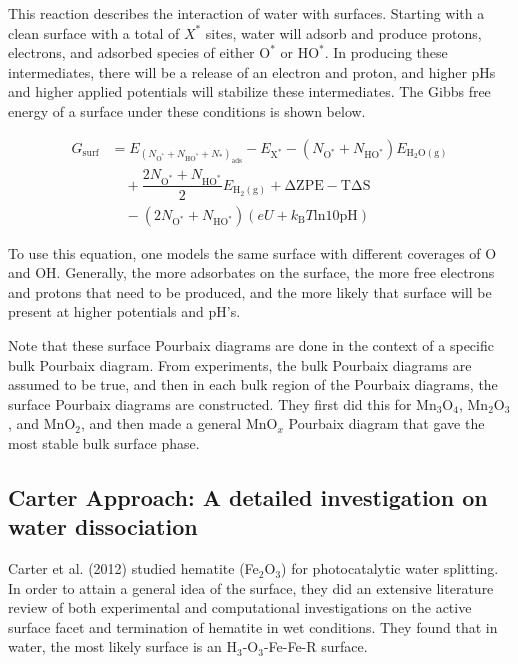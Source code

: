 \documentclass[11pt]{article}
\begin{document}
   This reaction describes the interaction of water with
   surfaces. Starting with a clean surface with a total of $X^\ast$
   sites, water will adsorb and produce protons, electrons, and adsorbed
   species of either $\mathrm{O^{\ast}}$ or $\mathrm{HO^{\ast}}$. In producing these
   intermediates, there will be a release of an electron and proton, and
   higher pHs and higher applied potentials will stabilize these
   intermediates. The Gibbs free energy of a surface under these
   conditions is shown below.
   
   \begin{equation}
   \begin{split}
   G_{\mathrm{surf}} &= E_{(N_{\mathrm{O^\ast}} + N_{\mathrm{HO^\ast}} + N_\ast)_{\mathrm{ads}}} - E_{\mathrm{X^{\ast}}} -
   (N_{\mathrm{O^\ast}} + N_{\mathrm{HO^\ast}}) E_{\mathrm{H_2O(g)}} \\ 
   &\quad + \dfrac{2N_{\mathrm{O^\ast}} +
   N_{\mathrm{HO^\ast}}}{2} E_{\mathrm{H_2(g)}} + \mathrm{\Delta ZPE -
   T\Delta S} \\
   &\quad - (2N_{\mathrm{O^\ast}} + N_{\mathrm{HO^\ast}})(eU +
   k_\mathrm{B}T\mathrm{ln}10\mathrm{pH})
   \end{split}
   \end{equation}
   
   To use this equation, one models the same surface with different
   coverages of O and OH. Generally, the more adsorbates on the surface,
   the more free electrons and protons that need to be produced, and the
   more likely that surface will be present at higher potentials and
   pH's.
   
   Note that these surface Pourbaix diagrams are done in the context
   of a specific bulk Pourbaix diagram. From experiments, the bulk Pourbaix
   diagrams are assumed to be true, and then in each bulk region of the
   Pourbaix diagrams, the surface Pourbaix diagrams are constructed. They
   first did this for Mn$_{3}$O$_{4}$, Mn$_{2}$O$_{3}$, and MnO$_{2}$, and then
   made a general MnO$_{x}$ Pourbaix diagram that gave the most stable bulk
   surface phase. 
   
\subsection{Carter Approach: A detailed investigation on water dissociation}
\label{sec-2-2}

   Carter et al. (2012) studied hematite (Fe$_{2}$O$_{3}$) for photocatalytic water
   splitting.
   In order to attain a general idea of the surface, they did an
   extensive literature review of both experimental and computational
   investigations on the active surface facet and termination of hematite
   in wet conditions.
   They found that in water, the most likely surface is an
   H$_{3}$-O$_{3}$-Fe-Fe-R surface. 
   
\end{document}
